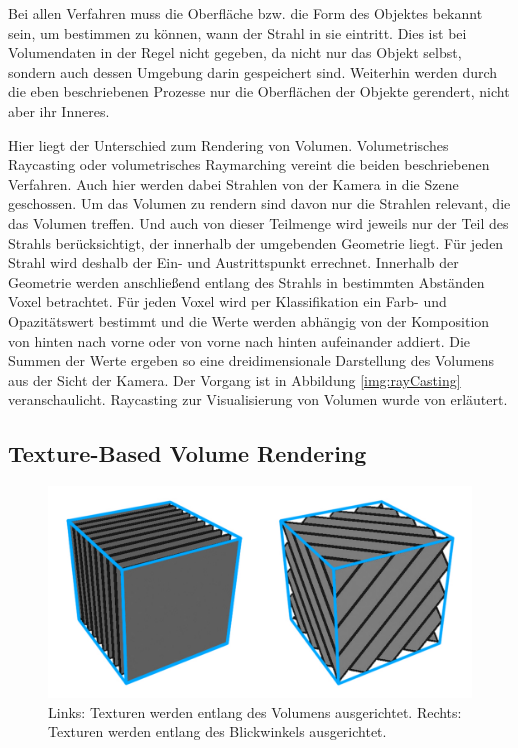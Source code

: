 Bei allen Verfahren muss die Oberfläche bzw. die Form des Objektes bekannt sein, um bestimmen zu können, wann der Strahl in sie eintritt. Dies ist bei Volumendaten in der Regel nicht gegeben, da nicht nur das Objekt selbst, sondern auch dessen Umgebung darin gespeichert sind. Weiterhin werden durch die eben beschriebenen Prozesse nur die Oberflächen der Objekte gerendert, nicht aber ihr Inneres.

Hier liegt der Unterschied zum Rendering von Volumen. Volumetrisches Raycasting oder volumetrisches Raymarching vereint die beiden beschriebenen Verfahren. Auch hier werden dabei Strahlen von der Kamera in die Szene geschossen. Um das Volumen zu rendern sind davon nur die Strahlen relevant, die das Volumen treffen. Und auch von dieser Teilmenge wird jeweils nur der Teil des Strahls berücksichtigt, der innerhalb der umgebenden Geometrie liegt. Für jeden Strahl wird deshalb der Ein- und Austrittspunkt errechnet. Innerhalb der Geometrie werden anschließend entlang des Strahls in bestimmten Abständen Voxel betrachtet. Für jeden Voxel wird per Klassifikation ein Farb- und Opazitätswert bestimmt und die Werte werden abhängig von der Komposition von hinten nach vorne oder von vorne nach hinten aufeinander addiert. Die Summen der Werte ergeben so eine dreidimensionale Darstellung des Volumens aus der Sicht der Kamera. Der Vorgang ist in Abbildung \ref{img:rayCasting} veranschaulicht.
Raycasting zur Visualisierung von Volumen wurde von \cite{Weiskopf06} erläutert.


\subsection{Texture-Based Volume Rendering}

\begin{figure}[!htb]
	\centering
	\includegraphics[width=0.7\linewidth]{images/texture_2d3d.pdf}
	\caption{Links: Texturen werden entlang des Volumens ausgerichtet. Rechts: Texturen werden entlang des Blickwinkels ausgerichtet.}
	\label{img:2D3DTex}
\end{figure}
\FloatBarrier

